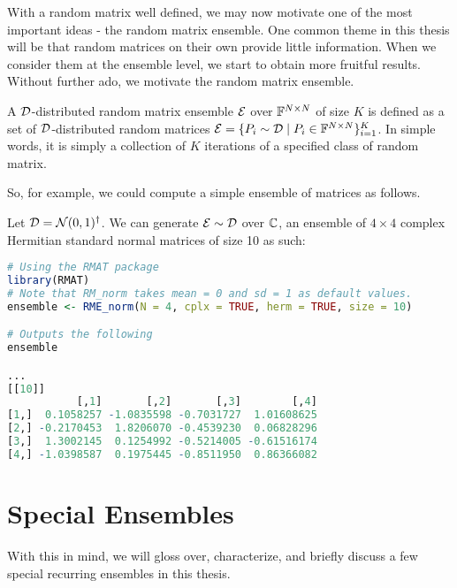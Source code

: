 With a random matrix well defined, we may now motivate one of the most important ideas - the random matrix ensemble. One common theme in this thesis will be that random matrices on their own provide little information. When we consider them at the ensemble level, we start to obtain more fruitful results. Without further ado, we motivate the random matrix ensemble.

\begin{definition}
A $\mathcal{D}$-distributed random matrix ensemble $\mathcal{E}$ over $\mathbb{F}^{N \times N}$ of size $K$ is defined as a set of $\mathcal{D}$-distributed random matrices $\mathcal{E} = \{P_i \sim \mathcal{D} \mid P_i \in \mathbb{F}^{N \times N}\}_{i = 1}^K$. In simple words, it is simply a collection of $K$ iterations of a specified class of random matrix.
\end{definition}

So, for example, we could compute a simple ensemble of matrices as follows.

\begin{code}
Let $\mathcal{D} = \mathcal{N}(0,1)^{\dagger}$. We can generate $\mathcal{E} \sim \mathcal{D}$ over $\mathbb{C}$, an ensemble of $4 \times 4$ complex Hermitian standard normal matrices of size 10 as such:
\end{code}

\begin{lstlisting}[language=R]
# Using the RMAT package
library(RMAT)
# Note that RM_norm takes mean = 0 and sd = 1 as default values.
ensemble <- RME_norm(N = 4, cplx = TRUE, herm = TRUE, size = 10)

# Outputs the following
ensemble

...
[[10]]
           [,1]       [,2]       [,3]        [,4]
[1,]  0.1058257 -1.0835598 -0.7031727  1.01608625
[2,] -0.2170453  1.8206070 -0.4539230  0.06828296
[3,]  1.3002145  0.1254992 -0.5214005 -0.61516174
[4,] -1.0398587  0.1975445 -0.8511950  0.86366082
\end{lstlisting}

\section{Special Ensembles}

With this in mind, we will gloss over, characterize, and briefly discuss a few special recurring ensembles in this thesis.

